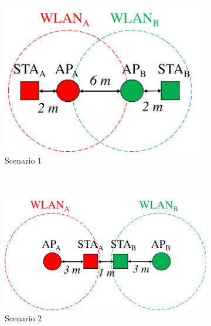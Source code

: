 \documentclass{article}
\begin{document}
\begin{figure}[t!]
	\centering		
	\begin{minipage}[b]{0.35\textwidth}		
		\begin{subfigure}[b]{0.8\linewidth}
			\includegraphics[width=\textwidth]{s1_interactions}
			\caption{Scenario 1}\label{fig:s1_interactions}
		\end{subfigure}\\[\baselineskip]
		\begin{subfigure}[b]{\linewidth}
			\includegraphics[width=\textwidth]{s2_interactions}
			\caption{Scenario 2}\label{fig:s2_interactions}
		\end{subfigure}
	\end{minipage}
	\begin{minipage}[b]{0.3\textwidth}		
		\begin{subfigure}[b]{\linewidth}

\end{subfigure}
\end{minipage}
\end{figure}
\end{document}

